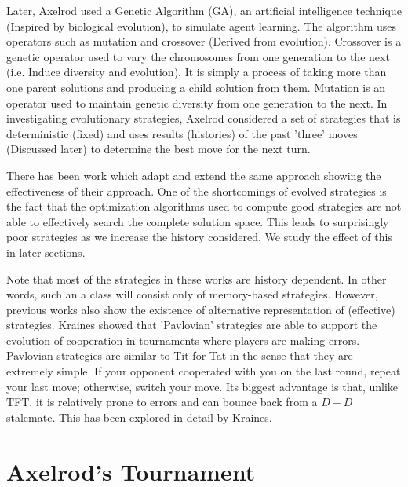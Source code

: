 \documentclass[a4paper]{article}
\begin{document}
	Later, Axelrod used a Genetic Algorithm (GA), an artificial intelligence technique (Inspired by biological evolution), to simulate agent learning. The algorithm uses operators such as mutation and crossover (Derived from evolution). Crossover is a genetic operator used to vary the chromosomes from one generation to the next (i.e. Induce diversity and evolution). It is simply a process of taking more than one parent solutions and producing a child solution from them. Mutation is an operator used to maintain genetic diversity from one generation to the next. In investigating evolutionary strategies, Axelrod considered a set of strategies that is deterministic (fixed) and uses results (histories) of the past 'three' moves (Discussed later) to determine the best move for the next turn.
	
	There has been work which adapt and extend the same approach showing the effectiveness of their approach. One of the shortcomings of evolved strategies is the fact that the optimization algorithms used to compute good strategies are not able to effectively search the complete solution space. This leads to surprisingly poor strategies as we increase the history considered. We study the effect of this in later sections.
	
	Note that most of the strategies in these works are history dependent. In other words, such an a class will consist only of memory-based strategies. However, previous works also show the existence of alternative representation of (effective) strategies. Kraines showed that 'Pavlovian' strategies are able to support the evolution of cooperation in tournaments where players are making errors. Pavlovian strategies are similar to Tit for Tat in the sense that they are extremely simple. If your opponent cooperated with you on the last round, repeat your last move; otherwise, switch your move. Its biggest advantage is that, unlike TFT, it is relatively prone to errors and can bounce back from a $D-D$ stalemate. This has been explored in detail by Kraines.
	
	\section{Axelrod's Tournament}
\end{document}
